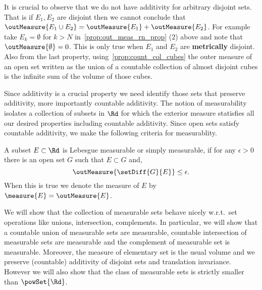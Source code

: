 It is crucial to observe that we do not have additivity for arbitrary disjoint sets. That is if $E_1,E_2$ are
disjoint then we cannot conclude that $\outMeasure{E_1\cup E_2} = \outMeasure{E_1} + \outMeasure{E_2}$. For
example take $E_k = \emptyset$ for $k > N$ in~\ref{prop:out_meas_rn_prop} (2) above 
and note that $\outMeasure{\emptyset} = 0$. This
is only true when $E_1$ and $E_2$ are \textbf{metrically} disjoint.  Also from the last property, 
using~\ref{prop:count_col_cubes} the outer measure of an open set written as the union of a countable
collection of almost disjoint cubes is the infinite sum of the volume of those cubes.

Since additivity is a crucial property we need identify those sets that preserve additivity, more importantly
countable additivity. The notion of measurability isolates a collection of subsets in $\Rd$ for which the
exterior measure statisfies all our desired properties including countable additivity. Since open sets satisfy
countable additivity, we make the following criteria for measurablity.
\begin{Definition}[name= (Volume) Lebesgue measure in $\Rn$]
    A subset $E \subset \Rd$ is Lebesgue measurable or simply measurable, if for any $\epsilon > 0$ there is
    an open set $G$ such that $E\subset G$ and,
    \[\outMeasure{\setDiff{G}{E}} \leq \epsilon.\]
    When this is true we denote the measure of $E$ by $\measure{E} = \outMeasure{E}$.
\end{Definition}
We will show that the collection of measurable sets behave nicely w.r.t.~set operations like unions,
intersection, complements. In particular, we will show that a countable union of measurable sets are
measurable, countable intersection of measurable sets are measurable and the complement of measurable set is
measurable. Moreover, the measure of elementary set is the usual volume and we preserve (countable) additivity
of disjoint sets and translation invariance. However we will also show that the class of measurable sets is
strictly smaller than $\powSet{\Rd}$.

